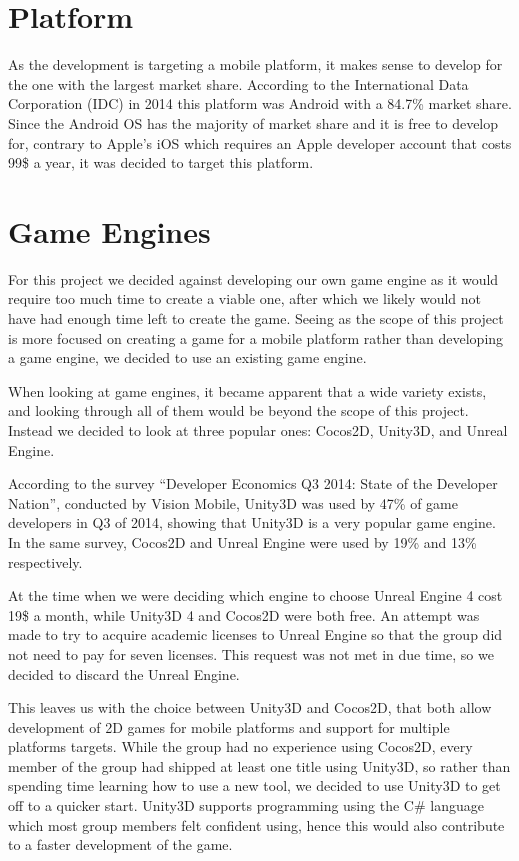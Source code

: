 %
%
%
%

\section{Platform} 
As the development is targeting a mobile platform, it makes sense to develop for the one with the largest market share.
According to the International Data Corporation (IDC) in 2014 this platform was Android with a 84.7\% market share\cite{marketshare}.
Since the Android OS has the majority of market share and it is free to develop for, contrary to Apple's iOS which requires an Apple developer account that costs 99\$ a year\cite{appledevprogram}, it was decided to target this platform.


\section{Game Engines}
For this project we decided against developing our own game engine as it would require too much time to create a viable one, after which we likely would not have had enough time left to create the game. 
Seeing as the scope of this project is more focused on creating a game for a mobile platform rather than developing a game engine, we decided to use an existing game engine.

When looking at game engines, it became apparent that a wide variety exists, and looking through all of them would be beyond the scope of this project.
Instead we decided to look at three popular ones: Cocos2D, Unity3D, and Unreal Engine.

According to the survey ``Developer Economics Q3 2014: State of the Developer Nation''\cite{visionmobile-survey}, conducted by Vision Mobile\cite{visionmobile}, Unity3D was used by 47\% of game developers in Q3 of 2014, showing that Unity3D is a very popular game engine. 
In the same survey, Cocos2D and Unreal Engine were used by 19\% and 13\% respectively.

At the time when we were deciding which engine to choose Unreal Engine 4 cost 19\$ a month\cite{unrealFree}, while Unity3D 4 and Cocos2D were both free. 
An attempt was made to try to acquire academic licenses to Unreal Engine so that the group did not need to pay for seven licenses. 
This request was not met in due time, so we decided to discard the Unreal Engine.

This leaves us with the choice between Unity3D and Cocos2D, that both allow development of 2D games for mobile platforms and support for multiple platforms targets.
While the group had no experience using Cocos2D, every member of the group had shipped at least one title using Unity3D, so rather than spending time learning how to use a new tool, we decided to use Unity3D to get off to a quicker start.
Unity3D supports programming using the C\# language which most group members felt confident using, hence this would also contribute to a faster development of the game.


